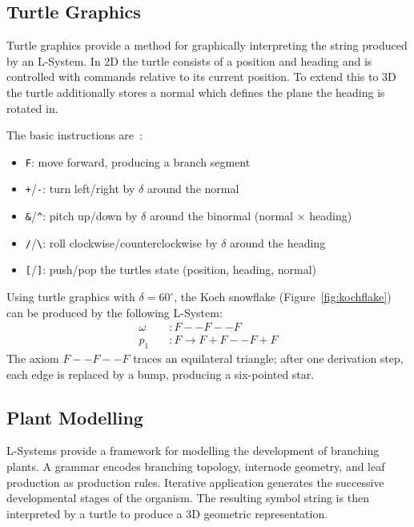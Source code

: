 \subsection{Turtle Graphics}

Turtle graphics provide a method for graphically interpreting the string produced by an L-System. In 2D the
turtle consists of a position and heading and is controlled with commands relative to its current position.
To extend this to 3D the turtle additionally stores a normal which defines the plane the heading is rotated in.

\medskip
The basic instructions are~\cite{prusinkiewiczAlgorithmicBeautyPlants1990, mishraLSystemFractals2007}:
\begin{itemize}
  \item \texttt{F}: move forward, producing a branch segment
  \item \texttt{+}/\texttt{-}: turn left/right by $\delta$ around the normal
  \item \texttt{\&}/\texttt{\^{}}: pitch up/down by $\delta$ around the binormal (normal $\times$ heading)
  \item \texttt{/}/\texttt{\textbackslash}: roll clockwise/counterclockwise by $\delta$ around the heading
  \item \texttt{[}/\texttt{]}: push/pop the turtles state (position, heading, normal)
\end{itemize}

Using turtle graphics with $\delta = 60^\circ$, the Koch snowflake (Figure~\ref{fig:kochflake}) can be
produced by the following L-System:
\begin{align*}
  \omega \quad &: F{-}{-}F{-}{-}F \\
  p_1    \quad &: F \rightarrow F{+}F{-}{-}F{+}F
\end{align*}
The axiom $F{-}{-}F{-}{-}F$ traces an equilateral triangle; after one derivation step, each edge is replaced
by a bump, producing a six-pointed star.

\subsection{Plant Modelling}

L-Systems provide a framework for modelling the development of branching plants. A grammar encodes branching
topology, internode geometry, and leaf production as production rules. Iterative application generates the
successive developmental stages of the organism. The resulting symbol string is then interpreted by a turtle
to produce a 3D geometric representation.

